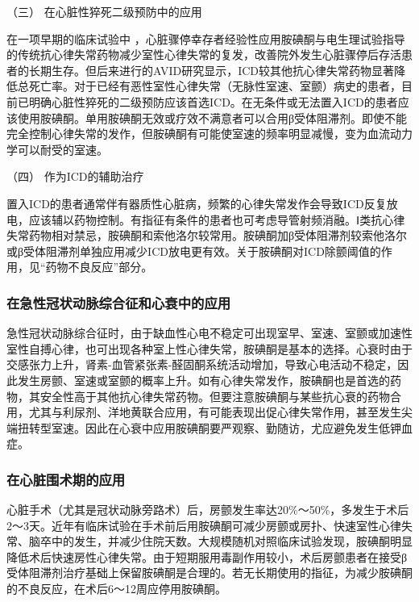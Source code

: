 \hypertarget{text00425.htmlux5cux23CHP17-4-7-2-3-3}{}
（三） 在心脏性猝死二级预防中的应用

在一项早期的临床试验中
，心脏骤停幸存者经验性应用胺碘酮与电生理试验指导的传统抗心律失常药物减少室性心律失常的复发，改善院外发生心脏骤停后存活患者的长期生存。但后来进行的AVID研究显示，ICD较其他抗心律失常药物显著降低总死亡率。对于已经有恶性室性心律失常（无脉性室速、室颤）病史的患者，目前已明确心脏性猝死的二级预防应该首选ICD。在无条件或无法置入ICD的患者应该使用胺碘酮。单用胺碘酮无效或疗效不满意者可以合用β受体阻滞剂。即使不能完全控制心律失常的发作，但胺碘酮有可能使室速的频率明显减慢，变为血流动力学可以耐受的室速。

\hypertarget{text00425.htmlux5cux23CHP17-4-7-2-3-4}{}
（四） 作为ICD的辅助治疗

置入ICD的患者通常伴有器质性心脏病，频繁的心律失常发作会导致ICD反复放电，应该辅以药物控制。有指征有条件的患者也可考虑导管射频消融。Ⅰ类抗心律失常药物相对禁忌，胺碘酮和索他洛尔较常用。胺碘酮加β受体阻滞剂较索他洛尔或β受体阻滞剂单独应用减少ICD放电更有效。关于胺碘酮对ICD除颤阈值的作用，见“药物不良反应”部分。

\subsubsection{在急性冠状动脉综合征和心衰中的应用}

急性冠状动脉综合征时，由于缺血性心电不稳定可出现室早、室速、室颤或加速性室性自搏心律，也可出现各种室上性心律失常，胺碘酮是基本的选择。心衰时由于交感张力上升，肾素-血管紧张素-醛固酮系统活动增加，导致心电活动不稳定，因此发生房颤、室速或室颤的概率上升。如有心律失常发作，胺碘酮也是首选的药物，其安全性高于其他抗心律失常药物。但要注意胺碘酮与某些抗心衰的药物合用，尤其与利尿剂、洋地黄联合应用，有可能表现出促心律失常作用，甚至发生尖端扭转型室速。因此在心衰中应用胺碘酮要严观察、勤随访，尤应避免发生低钾血症。

\subsubsection{在心脏围术期的应用}

心脏手术（尤其是冠状动脉旁路术）后，房颤发生率达20\%～50\%，多发生于术后2～3天。近年有临床试验在手术前后用胺碘酮可减少房颤或房扑、快速室性心律失常、脑卒中的发生，并减少住院天数。大规模随机对照临床试验发现，胺碘酮明显降低术后快速房性心律失常。由于短期服用毒副作用较小，术后房颤患者在接受β受体阻滞剂治疗基础上保留胺碘酮是合理的。若无长期使用的指征，为减少胺碘酮的不良反应，在术后6～12周应停用胺碘酮。

